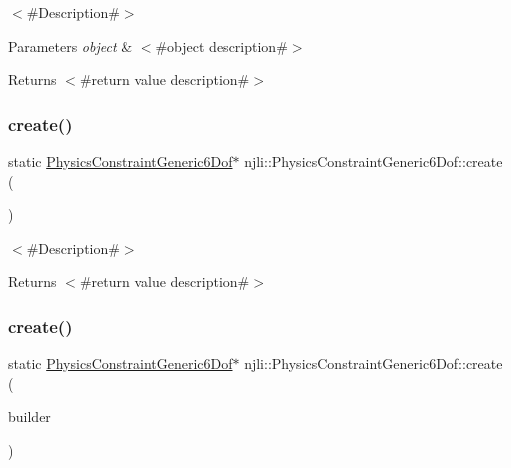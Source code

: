 $<$\#\+Description\#$>$


\begin{DoxyParams}{Parameters}
{\em object} & $<$\#object description\#$>$\\
\hline
\end{DoxyParams}
\begin{DoxyReturn}{Returns}
$<$\#return value description\#$>$ 
\end{DoxyReturn}
\mbox{\label{classnjli_1_1_physics_constraint_generic6_dof_a9127a08a4c28e717357b9f38ae4d2aa0}} 
\subsubsection{\texorpdfstring{create()}{create()}\hspace{0.1cm}{\footnotesize\ttfamily [1/2]}}
{\footnotesize\ttfamily static \mbox{\hyperlink{classnjli_1_1_physics_constraint_generic6_dof}{Physics\+Constraint\+Generic6\+Dof}}$\ast$ njli\+::\+Physics\+Constraint\+Generic6\+Dof\+::create (\begin{DoxyParamCaption}{ }\end{DoxyParamCaption})\hspace{0.3cm}{\ttfamily [static]}}

$<$\#\+Description\#$>$

\begin{DoxyReturn}{Returns}
$<$\#return value description\#$>$ 
\end{DoxyReturn}
\mbox{\label{classnjli_1_1_physics_constraint_generic6_dof_a3a1107170a0d064424b00f49f16dcf67}} 
\subsubsection{\texorpdfstring{create()}{create()}\hspace{0.1cm}{\footnotesize\ttfamily [2/2]}}
{\footnotesize\ttfamily static \mbox{\hyperlink{classnjli_1_1_physics_constraint_generic6_dof}{Physics\+Constraint\+Generic6\+Dof}}$\ast$ njli\+::\+Physics\+Constraint\+Generic6\+Dof\+::create (\begin{DoxyParamCaption}\item[{const \mbox{\hyperlink{classnjli_1_1_physics_constraint_generic6_dof_builder}{Physics\+Constraint\+Generic6\+Dof\+Builder}} \&}]{builder }\end{DoxyParamCaption})\hspace{0.3cm}{\ttfamily [static]}}

